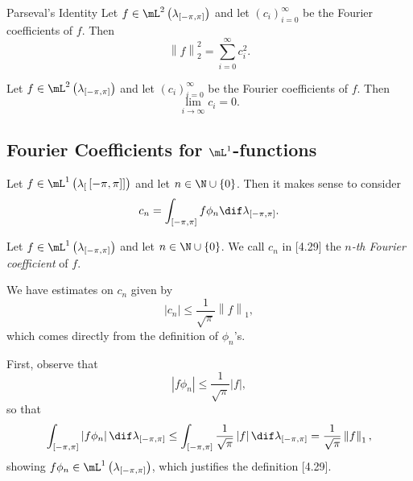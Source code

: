 \documentclass[pmath450]{subfiles}
\begin{document}
    \begin{prop}{Parseval's Identity}
        Let $f\in\mL^{2}\left( \lambda_{\left[ -\pi,\pi \right]} \right)$ and let $\left( c_{i} \right)^{\infty}_{i=0}$ be the Fourier coefficients of $f$. Then 
        \begin{equation*}
            \left\lVert f \right\rVert_{2}^{2} = \sum^{\infty}_{i=0} c_i^{2}.
        \end{equation*}
    \end{prop}


    \begin{cor}{}
        Let $f\in\mL^{2}\left( \lambda_{\left[ -\pi,\pi \right]} \right)$ and let $\left( c_{i} \right)^{\infty}_{i=0}$ be the Fourier coefficients of $f$. Then 
        \begin{equation*}
            \lim_{i\to\infty}c_i = 0.
        \end{equation*}
    \end{cor}	

    \rruleline
    
    \subsection{Fourier Coefficients for $\lone$-functions}

    Let $f\in\lone\left( \lambda_[\left[ -\pi,\pi \right]] \right)$ and let $n\in\N\cup\left\lbrace 0 \right\rbrace$. Then it makes sense to consider
    \begin{equation}
        c_n = \int^{}_{\left[ -\pi,\pi \right]}f\phi_n\dif\lambda_{\left[ -\pi,\pi \right]}.
    \end{equation}

    \begin{definition}{}
        Let $f\in\lone\left( \lambda_{\left[ -\pi,\pi \right]} \right)$ and let $n\in\N\cup\left\lbrace 0 \right\rbrace$. We call $c_n$ in [4.29] the \emph{$n$-th Fourier coefficient} of $f$.
    \end{definition}

    \np We have estimates on $c_n$ given by
    \begin{equation}
        \left| c_n \right| \leq \frac{1}{\sqrt{\pi}} \left\lVert f \right\rVert_{1},
    \end{equation}
    which comes directly from the definition of $\phi_n$'s.

    First, observe that
    \begin{equation*}
        \left| f\phi_n \right| \leq \frac{1}{\sqrt{\pi}} \left| f \right|,
    \end{equation*}
    so that
    \begin{equation*}
        \int^{}_{\left[ -\pi,\pi \right]} \left| f\phi_n \right|\dif\lambda_{\left[ -\pi,\pi \right]} \leq \int^{}_{\left[ -\pi,\pi \right]} \frac{1}{\sqrt{\pi}}\left| f \right|\dif\lambda_{\left[ -\pi,\pi \right]} = \frac{1}{\sqrt{\pi}} \left\lVert f \right\rVert_{1},
    \end{equation*}
    showing $f\phi_n\in\lone\left( \lambda_{\left[ -\pi,\pi \right]} \right)$, which justifies the definition [4.29].
\end{document}
